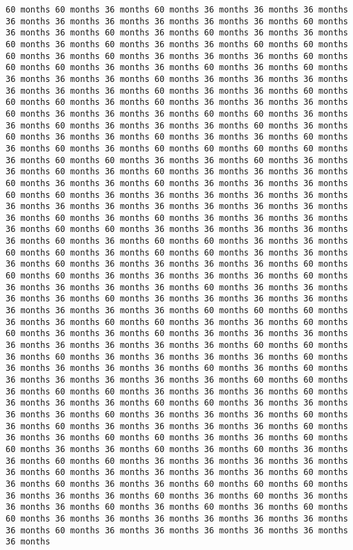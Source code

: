 \documentclass[11pt]{article}
\begin{document}
\begin{Verbatim}[commandchars=\\\{\}, frame=single, framerule=2mm, rulecolor=\color{outerrorbackground}]
60 months 60 months 36 months 60 months 36 months 36 months 36 months 36 months 36 months 36 months 36 months 36 months 36 months 60 months 36 months 36 months 60 months 36 months 60 months 36 months 36 months 60 months 36 months 60 months 36 months 36 months 60 months 60 months 60 months 36 months 60 months 36 months 36 months 36 months 60 months 60 months 60 months 36 months 36 months 60 months 36 months 60 months 36 months 36 months 36 months 60 months 36 months 36 months 36 months 36 months 36 months 36 months 60 months 36 months 36 months 60 months 60 months 60 months 36 months 60 months 36 months 36 months 36 months 60 months 36 months 36 months 36 months 60 months 60 months 36 months 36 months 60 months 36 months 36 months 36 months 60 months 36 months 60 months 36 months 36 months 60 months 36 months 36 months 60 months 36 months 60 months 36 months 60 months 60 months 60 months 60 months 36 months 60 months 60 months 36 months 36 months 60 months 36 months 36 months 60 months 36 months 60 months 36 months 36 months 36 months 60 months 36 months 36 months 60 months 36 months 36 months 36 months 60 months 60 months 36 months 36 months 36 months 36 months 36 months 36 months 36 months 36 months 36 months 36 months 36 months 36 months 36 months 60 months 36 months 60 months 36 months 36 months 36 months 36 months 60 months 60 months 36 months 36 months 36 months 36 months 36 months 60 months 36 months 60 months 60 months 36 months 36 months 60 months 60 months 36 months 60 months 60 months 36 months 36 months 36 months 60 months 36 months 36 months 36 months 36 months 60 months 60 months 60 months 36 months 36 months 36 months 36 months 60 months 36 months 36 months 36 months 36 months 60 months 36 months 36 months 36 months 36 months 60 months 36 months 36 months 36 months 36 months 36 months 36 months 36 months 36 months 60 months 60 months 60 months 36 months 36 months 60 months 60 months 36 months 36 months 60 months 60 months 36 months 36 months 60 months 36 months 36 months 36 months 36 months 36 months 36 months 36 months 36 months 60 months 60 months 36 months 60 months 36 months 36 months 36 months 36 months 60 months 36 months 36 months 36 months 36 months 60 months 36 months 60 months 36 months 36 months 36 months 36 months 36 months 60 months 60 months 36 months 60 months 60 months 36 months 36 months 36 months 60 months 36 months 36 months 36 months 60 months 60 months 36 months 36 months 36 months 36 months 60 months 36 months 36 months 36 months 60 months 36 months 60 months 36 months 36 months 36 months 36 months 60 months 36 months 36 months 60 months 60 months 36 months 36 months 60 months 60 months 36 months 36 months 60 months 36 months 60 months 36 months 36 months 60 months 60 months 36 months 36 months 36 months 36 months 36 months 60 months 36 months 36 months 36 months 36 months 60 months 36 months 60 months 36 months 36 months 60 months 60 months 60 months 36 months 36 months 36 months 60 months 36 months 60 months 36 months 36 months 36 months 60 months 36 months 60 months 36 months 60 months 60 months 36 months 36 months 36 months 36 months 36 months 36 months 36 months 60 months 36 months 36 months 36 months 36 months 36 months 36 months 
\end{Verbatim}
\end{document}
